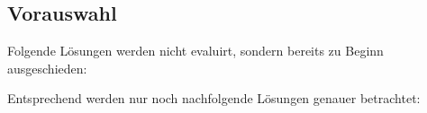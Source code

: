 
\begin{flushleft}
    \subsection{Vorauswahl}
    Folgende Lösungen werden nicht evaluirt, sondern bereits zu Beginn ausgeschieden:
    

    Entsprechend werden nur noch nachfolgende Lösungen genauer betrachtet:
    
\end{flushleft}